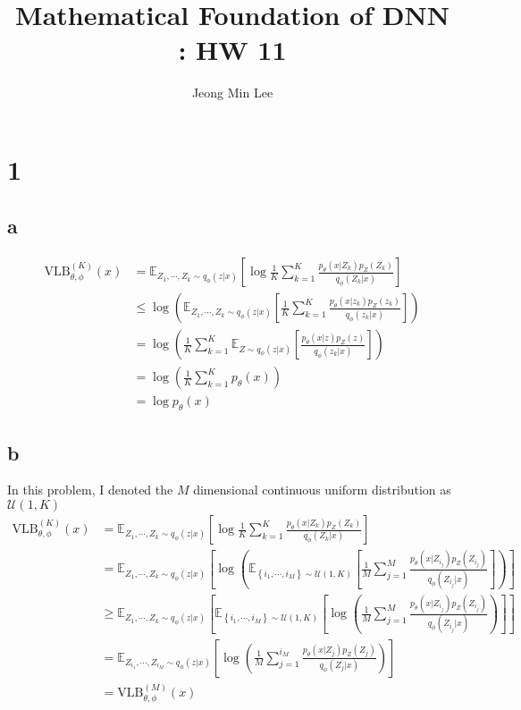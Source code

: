 \documentclass[10pt]{article}
\title{\textbf{Mathematical Foundation of DNN : HW 11}}
\author{Jeong Min Lee}
\begin{document}
\maketitle

\section*{1}
\subsection*{a}
\begin{align*}
    \text{VLB}_{\theta,\phi}^{(K)}(x) &= \mathbb{E}_{Z_1,\cdots, Z_k \sim q_\phi(z|x)}\left[\log \frac{1}{K} \sum_{k=1}^K \frac{p_\theta(x|Z_k)p_Z(Z_k)}{q_\phi(Z_k|x)}\right]\\
    &\le \log \left(\mathbb{E}_{Z_1,\cdots, Z_k \sim q_\phi(z|x)}\left[ \frac{1}{K} \sum_{k=1}^K \frac{p_\theta(x|z_k)p_Z(z_k)}{q_\phi(z_k|x)}\right]\right) \\
    & = \log \left(\frac{1}{K}\sum_{k=1}^K \mathbb{E}_{Z\sim q_\phi(z|x)}\left[\frac{p_\theta(x|z)p_Z(z)}{q_\phi(z_k|x)}\right]\right) \\
    &= \log \left(\frac{1}{K}\sum_{k=1}^K p_\theta(x)\right) \\
    &= \log p_\theta(x)
\end{align*}
\subsection*{b}
In this problem, I denoted the $M$ dimensional continuous uniform distribution as $\mathcal{U}(1,K)$
\begin{align*}
    \text{VLB}_{\theta,\phi}^{(K)}(x) &= \mathbb{E}_{Z_1, \cdots, Z_k \sim q_\phi(z|x)}\left[\log \frac{1}{K}\sum_{k=1}^K \frac{p_\theta(x|Z_k)p_Z(Z_k)}{q_\phi(Z_k|x)}\right] \\
    &= \mathbb{E}_{Z_1, \cdots, Z_k \sim q_\phi(z|x)}\left[\log \left( \mathbb{E}_{\left\{i_1, \cdots, i_M\right\} \sim \mathcal{U}(1,K)}\left[\frac{1}{M}\sum_{j=1}^M \frac{p_\theta(x|Z_{i_j})p_Z(Z_{i_j})}{q_\phi(Z_{i_j}|x)}\right]\right)\right] \\
    &\ge \mathbb{E}_{Z_1, \cdots, Z_k \sim q_\phi(z|x)}\left[\mathbb{E}_{\left\{i_1, \cdots, i_M\right\} \sim \mathcal{U}(1,K)}\left[\log\left(\frac{1}{M}\sum_{j=1}^M \frac{p_\theta(x|Z_{i_j})p_Z(Z_{i_j})}{q_\phi(Z_{i_j}|x)}\right)\right]\right] \\
    &= \mathbb{E}_{Z_{i_1}, \cdots,Z_{i_M} \sim q_\phi(z|x)} \left[\log \left( \frac{1}{M}\sum_{j=1}^{i_M} \frac{p_\theta(x|Z_j)p_Z(Z_j)}{q_\phi(Z_j|x)}\right)\right] \\
    &= \text{VLB}_{\theta,\phi}^{(M)}(x)
\end{align*}
\end{document}
